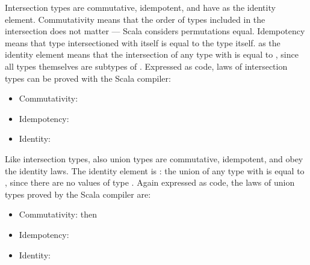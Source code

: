 Intersection types are commutative, idempotent, and have  as the identity element. Commutativity means that the order of types included in the intersection does not matter --- Scala considers permutations equal. Idempotency means that type intersectioned with itself is equal to the type itself.  as the identity element means that the intersection of any type  with  is equal to , since all types themselves are subtypes of . Expressed as code, laws of intersection types can be proved with the Scala compiler:
\begin{itemize}
    \item Commutativity: 
    \item Idempotency: 
    \item Identity: 
\end{itemize}

Like intersection types, also union types are commutative, idempotent, and obey the identity laws. The identity element is : the union of any type  with  is equal to , since there are no values of type . Again expressed as code, the laws of union types proved by the Scala compiler are:
\begin{itemize}
    \item Commutativity: 
    then\item Idempotency: 
    \item Identity: 
\end{itemize}
